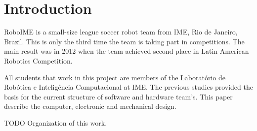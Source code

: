 \section{Introduction}
    RoboIME is a small-size league soccer robot team from IME, Rio de Janeiro, Brazil. This
is only the third time the team is taking part in competitions. The main result was in 2012
when the team achieved second place in Latin American Robotics Competition.

All students that work in this project are members of the Laboratório de Robótica e
Inteligência Computacional at IME. The previous studies \cite{alexandre}\cite{marco} provided
the basis for the current structure of software and hardware team's. This paper describe the
computer, electronic and mechanical design.

TODO Organization of this work.
